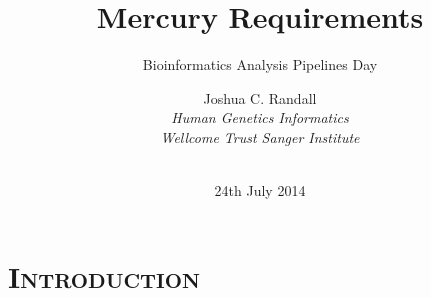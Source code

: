 \documentclass[xcolor=x11names,compress]{beamer}
\makeatletter
\renewcommand{\(}{\begin{columns}}
\renewcommand{\)}{\end{columns}}
\newcommand{\<}[1]{\begin{column}{#1}}
\renewcommand{\>}{\end{column}}
\newenvironment{backgroundblock}[2]{%
  \global\setbox\@backgroundblock=\vbox\bgroup%
    \unvbox\@backgroundblock%
    \vbox to0pt\bgroup\vskip#2\hbox to0pt\bgroup\hskip#1\relax%
}{\egroup\egroup\egroup}
\makeatother
\begin{document}
\section*{\scshape Introduction}
\begin{frame}
\title{Mercury Requirements}
\subtitle{Bioinformatics Analysis Pipelines Day}
\author{
	Joshua C. Randall \\
	{\it 
	Human Genetics Informatics \\
	Wellcome Trust Sanger Institute 
	}\\
}
\date{
	 \\
	\vspace{0.5cm}
	24th July 2014
}
\titlepage
\end{frame}


\newcommand{\pipesbackground}{
	\begin{backgroundblock}{0cm}{0cm}
		\vbox to \paperheight{\vfil\hbox to \paperwidth{\hfil
		\begin{overpic}[height=0.85\paperheight]{images/Jano_De_Cesare_-_Pipelines_-_by-nc-nd-2_0_-_flickr}
		\put(88,0.5){\textcolor{gray}{\fontsize{4}{6}\selectfont Photo: Jano De Cesare}}
		\end{overpic}
		\hfil\hskip 2mm}\vfil}
	\end{backgroundblock}
}
\end{document}
